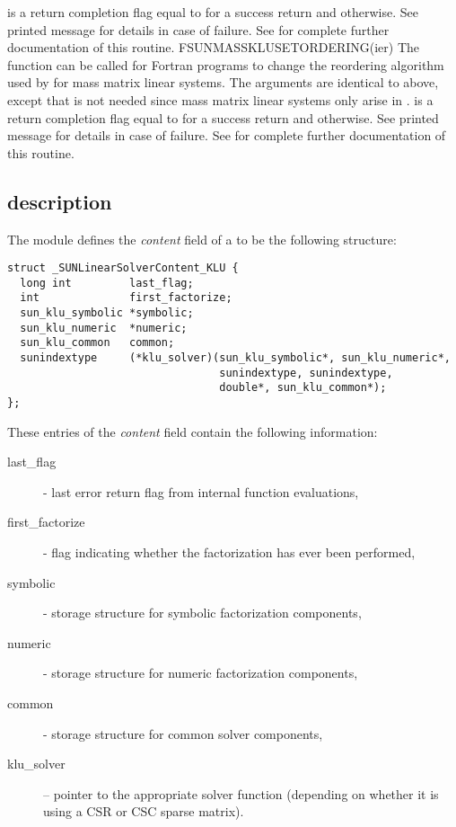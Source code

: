 {
   is a  return completion flag equal to  for a success
  return and  otherwise. See printed message for details in case
  of failure.
}
{
  See  for complete further documentation of
  this routine. 
}
{
  FSUNMASSKLUSETORDERING(ier)
}
{
  The function  can be called for Fortran programs
  to change the reordering algorithm used by {\klu} for mass matrix linear systems.
}
{
  The arguments are identical to  above, except that
   is not needed since mass matrix linear systems only arise
  in {\arkode}.
}
{
   is a  return completion flag equal to  for a success
  return and  otherwise. See printed message for details in case
  of failure.
}
{
  See  for complete further documentation of
  this routine. 
}


\subsection{{\sunlinsolklu} description}\label{ss:sunlinsol_klu_description}


The {\sunlinsolklu} module defines the {\em
content} field of a  to be the following structure:
\begin{verbatim} 
struct _SUNLinearSolverContent_KLU {
  long int         last_flag;
  int              first_factorize;
  sun_klu_symbolic *symbolic;
  sun_klu_numeric  *numeric;
  sun_klu_common   common;
  sunindextype     (*klu_solver)(sun_klu_symbolic*, sun_klu_numeric*,
                                 sunindextype, sunindextype,
                                 double*, sun_klu_common*);
};
\end{verbatim}
These entries of the \emph{content} field contain the following
information:
\begin{description}
  \item[last\_flag] - last error return flag from internal function evaluations,
  \item[first\_factorize] - flag indicating whether the factorization
    has ever been performed, 
  \item[symbolic] - {\klu} storage structure for symbolic factorization components,
  \item[numeric] - {\klu} storage structure for numeric factorization components,
  \item[common] - storage structure for common {\klu} solver components,
  \item[klu\_solver] -- pointer to the appropriate {\klu} solver function
    (depending on whether it is using a CSR or CSC sparse matrix).
\end{description}

